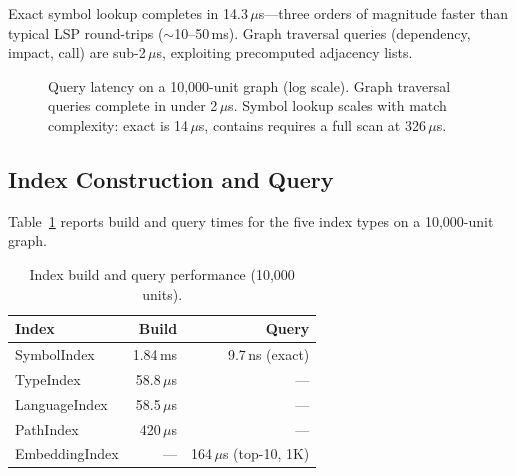 \documentclass[10pt, twocolumn]{article}
\begin{document}
Exact symbol lookup completes in 14.3\,$\mu$s---three orders of magnitude faster than typical LSP round-trips ($\sim$10--50\,ms). Graph traversal queries (dependency, impact, call) are sub-2\,$\mu$s, exploiting precomputed adjacency lists.

\begin{figure}[t]
\centering
{}
\caption{Query latency on a 10{,}000-unit graph (log scale). Graph traversal queries complete in under 2\,$\mu$s. Symbol lookup scales with match complexity: exact is 14\,$\mu$s, contains requires a full scan at 326\,$\mu$s.}
\label{fig:querylat}
\end{figure}


\subsection{Index Construction and Query}

Table~\ref{tab:index} reports build and query times for the five index types on a 10{,}000-unit graph.

\begin{table}[t]
\caption{Index build and query performance (10{,}000 units).}
\label{tab:index}
\centering
\small
\begin{tabular}{@{}lrr@{}}
\toprule
\textbf{Index} & \textbf{Build} & \textbf{Query} \\
\midrule
SymbolIndex     & 1.84\,ms & 9.7\,ns (exact) \\
TypeIndex       & 58.8\,$\mu$s & --- \\
LanguageIndex   & 58.5\,$\mu$s & --- \\
PathIndex       & 420\,$\mu$s & --- \\
EmbeddingIndex  & --- & 164\,$\mu$s (top-10, 1K) \\
\bottomrule
\end{tabular}
\end{table}
\end{document}
